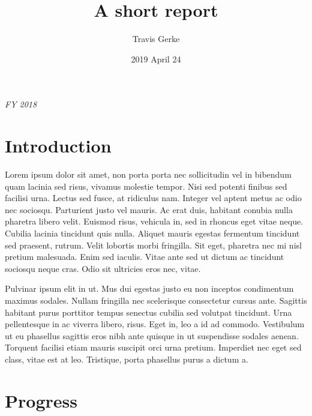 \documentclass[]{article}
\title{A short report}
\author{Travis Gerke}
\date{2019 April 24}
\begin{document}
\makeatletter
\renewcommand{\maketitle}{\bgroup\vspace*{-2cm}\setlength{\parindent}{0pt}
\begin{flushleft}
  \textbf{\@title}
  
    \emph{FY 2018}
    
  \@author
  
  \@date
  
\end{flushleft}\egroup
}
\makeatother
\maketitle

\hypertarget{introduction}{%
\section{Introduction}\label{introduction}}

Lorem ipsum dolor sit amet, non porta porta nec sollicitudin vel in
bibendum quam lacinia sed risus, vivamus molestie tempor. Nisi sed
potenti finibus sed facilisi urna. Lectus sed fusce, at ridiculus nam.
Integer vel aptent metus ac odio nec sociosqu. Parturient justo vel
mauris. Ac erat duis, habitant conubia nulla pharetra libero velit.
Euismod risus, vehicula in, sed in rhoncus eget vitae neque. Cubilia
lacinia tincidunt quis nulla. Aliquet mauris egestas fermentum tincidunt
sed praesent, rutrum. Velit lobortis morbi fringilla. Sit eget, pharetra
nec mi nisl pretium malesuada. Enim sed iaculis. Vitae ante sed ut
dictum ac tincidunt sociosqu neque cras. Odio sit ultricies eros nec,
vitae.

Pulvinar ipsum elit in ut. Mus dui egestas justo eu non inceptos
condimentum maximus sodales. Nullam fringilla nec scelerisque
consectetur cursus ante. Sagittis habitant purus porttitor tempus
senectus cubilia sed volutpat tincidunt. Urna pellentesque in ac viverra
libero, risus. Eget in, leo a id ad commodo. Vestibulum ut eu phasellus
sagittis eros nibh ante quisque in ut suspendisse sodales aenean.
Torquent facilisi etiam mauris suscipit orci urna pretium. Imperdiet nec
eget sed class, vitae est at leo. Tristique, porta phasellus purus a
dictum a.

\hypertarget{progress}{%
\section{Progress}\label{progress}}
\end{document}

